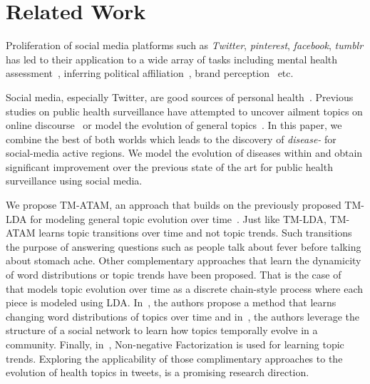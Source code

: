 \section{Related Work}
\label{sec:relwork}
Proliferation of social media platforms such as \emph{Twitter},
\emph{pinterest}, \emph{facebook}, \emph{tumblr} has led to their
application to a wide array of tasks including mental health
assessment~\cite{twitter:anorexia,twitter:violence,twitter:mental}, 
inferring political affiliation~\cite{twitter:elec,twitter:elec2,twitter:elec3,twitter:elec4},
brand perception~\cite{twitter:brand,twitter:brand2} etc.

Social media, especially Twitter, are good sources of personal
health~\cite{twitter:health,twitter:health2,twitter:health3,twitter:health4}.
Previous studies on public health surveillance have attempted to
uncover ailment topics on online
discourse~\cite{DBLP:conf/nips/ChemuduguntaSS06,atam2} or model the
evolution of general topics~\cite{DBLP:conf/kdd/WangAB12}. In this
paper, we combine the best of both worlds which leads to the discovery
of \emph{disease-\changes} for social-media active regions. We model
the evolution of diseases within \changes and obtain significant
improvement over the previous state of the art for public health
surveillance using social media.

We propose TM-ATAM, an approach that builds on the previously proposed
TM-LDA for modeling general topic evolution over
time~\cite{DBLP:conf/kdd/WangAB12}. Just like TM-LDA, TM-ATAM learns
topic transitions over time and not topic trends. Such transitions the
purpose of answering questions such as people talk about fever before
talking about stomach ache. Other complementary approaches that learn
the dynamicity of word distributions or topic trends have been
proposed. That is the case of~\cite{DBLP:conf/icml/BleiL06} that
models topic evolution over time as a discrete chain-style process
where each piece is modeled using
LDA. In~\cite{DBLP:conf/kdd/WangM06}, the authors propose a method
that learns changing word distributions of topics over time and
in~\cite{DBLP:conf/icdm/LinMHJD11}, the authors leverage the structure
of a social network to learn how topics temporally evolve in a
community. Finally, in~\cite{DBLP:conf/wsdm/SahaS12}, Non-negative
Factorization is used for learning topic trends. Exploring the
applicability of those complimentary approaches to the evolution of
health topics in tweets, is a promising research direction.



